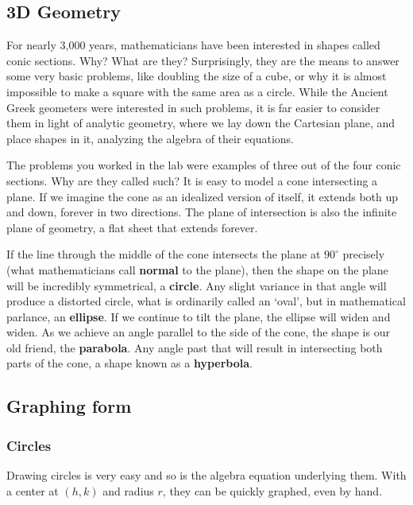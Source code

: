 
\subsection{3D Geometry}
For nearly 3,000 years, mathematicians have been interested in shapes called
conic sections.  Why?  What are they?  Surprisingly, they are the means to answer some
very basic problems, like doubling the size of a cube, or why it is almost impossible to make
a square with the same area as a circle.  While the Ancient Greek geometers were interested
in such problems, it is far easier to consider them in light of analytic geometry, where we 
lay down the Cartesian plane, and place shapes in it, analyzing the algebra of their equations.

The problems you worked in the lab were examples of three out of the four conic sections.
Why are they called such?  It is easy to model a cone intersecting a plane.  If we
imagine the cone as an idealized version of itself, it extends both up and down, forever
in two directions.  The plane of intersection is also the infinite plane of geometry, a flat
sheet that extends forever.

If the line through the middle of the cone intersects the plane at $90^\circ$ precisely
(what mathematicians call \textbf{normal} to the plane), then the shape on the plane will
be incredibly symmetrical, a \textbf{circle}.  Any slight variance in that angle will produce a
distorted circle, what is ordinarily called an `oval', but in mathematical parlance, an
\textbf{ellipse}. If we continue to tilt the plane, the ellipse will widen and widen.  As we
achieve an angle parallel to the side of the cone, the shape is our old friend, the 
\textbf{parabola}.  Any angle past that will result in intersecting both parts of the cone,
a shape known as a \textbf{hyperbola}.

\subsection{Graphing form}
\subsubsection{Circles}
Drawing circles is very easy and so is the algebra equation underlying them.  With a center
at $(h,k)$ and radius $r$, they can be quickly graphed, even by hand.


